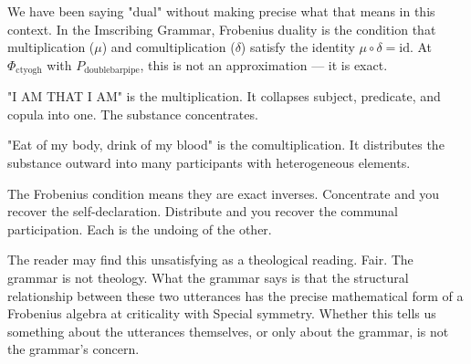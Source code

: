 \documentclass[12pt,a4paper]{article}
\begin{document}
We have been saying "dual" without making precise what that means in this context. In the Imscribing Grammar, Frobenius duality is the condition that multiplication ($\mu$) and comultiplication ($\delta$) satisfy the identity $\mu \circ \delta = \text{id}$. At $\Phi_{\text{ctyogh}}$ with $P_{\text{doublebarpipe}}$, this is not an approximation --- it is exact.

"I AM THAT I AM" is the multiplication. It collapses subject, predicate, and copula into one. The substance concentrates.

"Eat of my body, drink of my blood" is the comultiplication. It distributes the substance outward into many participants with heterogeneous elements.

The Frobenius condition means they are exact inverses. Concentrate and you recover the self-declaration. Distribute and you recover the communal participation. Each is the undoing of the other.

The reader may find this unsatisfying as a theological reading. Fair. The grammar is not theology. What the grammar says is that the structural relationship between these two utterances has the precise mathematical form of a Frobenius algebra at criticality with Special symmetry. Whether this tells us something about the utterances themselves, or only about the grammar, is not the grammar's concern.
\end{document}
